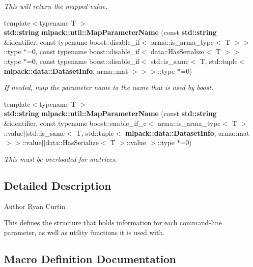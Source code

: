 \begin{DoxyCompactItemize}
\begin{DoxyCompactList}\small\item\em This will return the mapped value. \end{DoxyCompactList}\item 
{\footnotesize template$<$typename T $>$ }\\{\bf std\+::string} {\bf mlpack\+::util\+::\+Map\+Parameter\+Name} (const {\bf std\+::string} \&identifier, const typename boost\+::disable\+\_\+if$<$ arma\+::is\+\_\+arma\+\_\+type$<$ T $>$$>$\+::type $\ast$=0, const typename boost\+::disable\+\_\+if$<$ data\+::\+Has\+Serialize$<$ T $>$$>$\+::type $\ast$=0, const typename boost\+::disable\+\_\+if$<$ std\+::is\+\_\+same$<$ T, std\+::tuple$<$ {\bf mlpack\+::data\+::\+Dataset\+Info}, arma\+::mat $>$$>$$>$\+::type $\ast$=0)
\begin{DoxyCompactList}\small\item\em If needed, map the parameter name to the name that is used by boost. \end{DoxyCompactList}\item 
{\footnotesize template$<$typename T $>$ }\\{\bf std\+::string} {\bf mlpack\+::util\+::\+Map\+Parameter\+Name} (const {\bf std\+::string} \&identifier, const typename boost\+::enable\+\_\+if\+\_\+c$<$ arma\+::is\+\_\+arma\+\_\+type$<$ T $>$\+::value$\vert$$\vert$std\+::is\+\_\+same$<$ T, std\+::tuple$<$ {\bf mlpack\+::data\+::\+Dataset\+Info}, arma\+::mat $>$$>$\+::value$\vert$$\vert$data\+::\+Has\+Serialize$<$ T $>$\+::value $>$\+::type $\ast$=0)
\begin{DoxyCompactList}\small\item\em This must be overloaded for matrices. \end{DoxyCompactList}\end{DoxyCompactItemize}


\subsection{Detailed Description}
\begin{DoxyAuthor}{Author}
Ryan Curtin
\end{DoxyAuthor}
This defines the structure that holds information for each command-\/line parameter, as well as utility functions it is used with. 

\subsection{Macro Definition Documentation}
